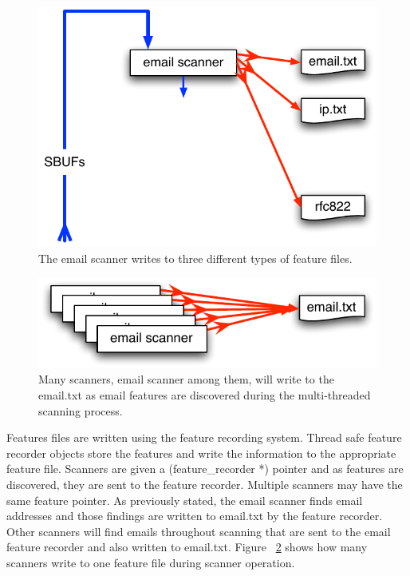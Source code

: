 \documentclass[11pt,fleqn]{article} %
\begin{document}
\begin{figure}
	\includegraphics[scale=0.90]{scannersextractfeatures.pdf}
	\caption{The email scanner writes to three different types of feature files.}
	\label{fig:scannersextractfeatures}
\end{figure}

\begin{figure}
	\includegraphics[scale=0.90]{writetoemail.pdf}
	\caption{Many scanners, email scanner among them, will write to the email.txt as email features are discovered during the multi-threaded scanning process.}
	\label{fig:writetoemail}
\end{figure}

Features files are written using the feature recording system. Thread safe feature recorder objects store the features and write the information to the appropriate feature file. Scanners are given a (feature\_recorder *) pointer and as features are discovered, they are sent to the feature recorder. Multiple scanners may have the same feature pointer. As previously stated, the email scanner finds email addresses and those findings are written to email.txt by the feature recorder. Other scanners will find emails throughout scanning that are sent to the email feature recorder and also written to email.txt. Figure ~\ref{fig:writetoemail} shows how many scanners write to one feature file during \bulk scanner operation.\\
\end{document}

